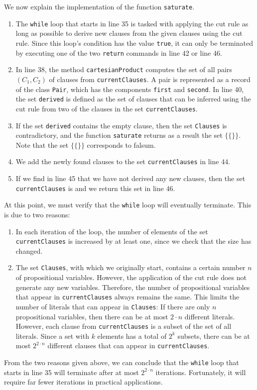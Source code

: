 We now explain the implementation of the function \texttt{saturate}.
\begin{enumerate}
\item The \texttt{while} loop that starts in line 35 is tasked with applying the cut rule
      as long as possible to derive new clauses from the given
      clauses using the cut rule. Since this loop's condition has the value \texttt{true}, it can only be
      terminated by executing one of the two \texttt{return} commands in line 42 or line 46.
\item In line 38, the method \texttt{cartesianProduct} computes the set of all pairs $(C_1, C_2)$ of clauses
      from \texttt{currentClauses}.  A pair is represented as a record of the class \texttt{Pair}, which has
      the components \texttt{first} and \texttt{second}.  In line 40, the set \texttt{derived} is defined as
      the set of clauses that can be inferred using the
      cut rule from two of the clauses in the set \texttt{currentClauses}.
\item If the set \texttt{derived} contains the empty clause, then the set
      \texttt{Clauses} is contradictory, and the function \texttt{saturate} returns as a result the
      set $\bigl\{ \{\} \bigr\}$. Note that the set $\bigl\{ \{\} \bigr\}$ corresponds to falsum.
\item We add the newly found clauses to the set \texttt{currentClauses} in line 44.
\item If we find in line 45 that we have not derived any new clauses,
      then the set \texttt{currentClauses} is  and we return this set in line 46.
\end{enumerate}
At this point, we must verify that the \texttt{while} loop will eventually
terminate. This is due to two reasons:
\begin{enumerate}
\item In each iteration of the loop, the number of elements of the set \texttt{currentClauses}
      is increased by at least one, since we check that the size has changed.
\item The set \texttt{Clauses}, with which we originally start, contains a certain number $n$
      of propositional variables. However, the application of the cut rule does not generate any new
      variables. Therefore, the number of propositional variables that appear in
      \texttt{currentClauses} always remains the same. This limits the number of literals
      that can appear in \texttt{Clauses}: If there are only $n$ propositional variables,
      then there can be at most $2 \cdot n$ different literals.  However, each clause from \texttt{currentClauses} is
      a subset of the set of all literals.  Since a set with $k$ elements has a total of $2^k$
      subsets, there can be at most $2^{2 \cdot n}$ different clauses that can appear in
      \texttt{currentClauses}.
\end{enumerate}
From the two reasons given above, we can conclude that the \texttt{while} loop that starts in
line 35 will terminate after at most $2^{2 \cdot n}$ iterations.  Fortunately, it will require far fewer
iterations in practical applications.



